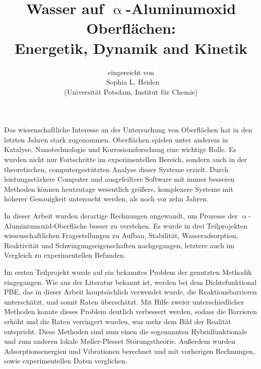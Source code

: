 \documentclass[11pt,DIV=13,a4paper,headinclude,german]{scrartcl}
\begin{document}
\titlehead{\centering\normalfont\large\scshape Allgemeinverständliche Zusammenfassung}
\title{\Large\vspace{-\baselineskip} Wasser auf $\upalpha$-Aluminumoxid Oberflächen:\\
  Energetik, Dynamik and Kinetik\vspace{0\baselineskip}}
\author{\large\sffamily eingereicht von\\
  \Large\textbf\sffamily\ Sophia L. Heiden\\
  \large\sffamily (Universit\"{a}t Potsdam, Institut f\"{u}r Chemie)}
\date{}
\maketitle
\vspace{-1cm}
Das wissenschaftliche Interesse an der Untersuchung von Oberflächen hat in den letzten Jahren stark zugenommen.
Oberflächen spielen unter anderem in Katalyse, Nanotechnologie und Korrosionsforschung eine wichtige Rolle.
Es wurden nicht nur Fortschritte im experimentellen Bereich, sondern auch in der theoretischen, computergestützten Analyse dieser Systeme erzielt.
Durch leistungsstärkere Computer und ausgefeiltere Software mit immer besseren Methoden können heutzutage wesentlich größere, komplexere Systeme mit höherer Genauigkeit untersucht werden, als noch vor zehn Jahren.

In dieser Arbeit wurden derartige Rechnungen angewandt, um Prozesse der $\upalpha$-Aluminiumoxid-Oberfläche besser zu verstehen.
Es wurde in drei Teilprojekten wissenschaftlichen Fragestellungen zu Aufbau, Stabilität, Wasseradsorption, Reaktivität und Schwingungseigenschaften nachgegangen, letztere auch im Vergleich zu experimentellen Befunden.


Im ersten Teilprojekt wurde auf ein bekanntes Problem der genutzten Methodik eingegangen.
Wie aus der Literatur bekannt ist, werden bei dem Dichtefunktional PBE, das in dieser Arbeit hauptsächlich verwendet wurde, die Reaktionsbarrieren unterschätzt, und somit Raten überschätzt.
Mit Hilfe zweier unterschiedlicher Methoden konnte dieses Problem deutlich verbessert werden, sodass die Barrieren erhöht und die Raten verringert wurden, was mehr dem Bild der Realität entspricht.
Diese Methoden sind zum einen die sogenannten Hybridfunktionale und zum anderen lokale M\o{}ller-Plesset Störungstheorie.
Außerdem wurden Adsorptionsenergien und Vibrationen berechnet und mit vorherigen Rechnungen, sowie experimentellen Daten verglichen.
\end{document}
